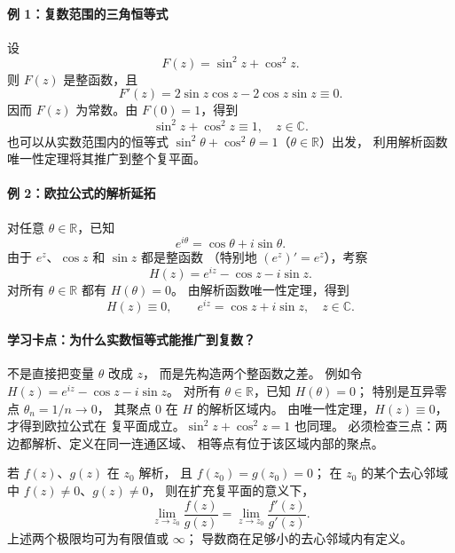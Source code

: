 \paragraph{例 1：复数范围的三角恒等式}
设
\[
  F(z)=\sin^2 z+\cos^2 z.
\]
则 $F(z)$ 是整函数，且
\[
  F'(z)=2\sin z\cos z-2\cos z\sin z\equiv0.
\]
因而 $F(z)$ 为常数。由 $F(0)=1$，得到
\[
  \boxed{\sin^2 z+\cos^2 z\equiv1,\quad z\in\mathbb C.}
\]
也可以从实数范围内的恒等式
$\sin^2\theta+\cos^2\theta=1$（$\theta\in\mathbb R$）出发，
利用解析函数唯一性定理将其推广到整个复平面。

\paragraph{例 2：欧拉公式的解析延拓}
对任意 $\theta\in\mathbb R$，已知
\[
  e^{i\theta}=\cos\theta+i\sin\theta.
\]
由于 $e^z$、$\cos z$ 和 $\sin z$ 都是整函数
（特别地 $(e^z)'=e^z$），考察
\[
  H(z)=e^{iz}-\cos z-i\sin z.
\]
对所有 $\theta\in\mathbb R$ 都有 $H(\theta)=0$。
由解析函数唯一性定理，得到
\[
  H(z)\equiv0,\qquad
  \boxed{e^{iz}=\cos z+i\sin z,\quad z\in\mathbb C.}
\]


\paragraph{学习卡点：为什么实数恒等式能推广到复数？}
不是直接把变量 $\theta$ 改成 $z$，
而是先构造两个整函数之差。
例如令
$H(z)=e^{iz}-\cos z-i\sin z$。
对所有 $\theta\in\mathbb R$，已知 $H(\theta)=0$；
特别是互异零点 $\theta_n=1/n\to0$，
其聚点 $0$ 在 $H$ 的解析区域内。
由唯一性定理，$H(z)\equiv0$，才得到欧拉公式在
复平面成立。$\sin^2z+\cos^2z=1$ 也同理。
必须检查三点：两边都解析、定义在同一连通区域、
相等点有位于该区域内部的聚点。


\begin{proposition}
若 $f(z)$、$g(z)$ 在 $z_0$ 解析，
且 $f(z_0)=g(z_0)=0$；
在 $z_0$ 的某个去心邻域中 $f(z)\ne0$、$g(z)\ne0$，
则在扩充复平面的意义下，
\[
  \boxed{\lim_{z\to z_0}\frac{f(z)}{g(z)}
   =\lim_{z\to z_0}\frac{f'(z)}{g'(z)}.}
\]
上述两个极限均可为有限值或 $\infty$；
导数商在足够小的去心邻域内有定义。
\end{proposition}

